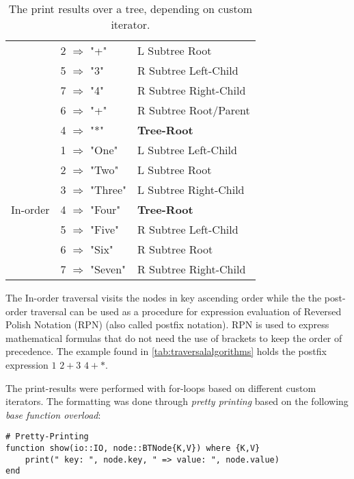\documentclass[a4paper, 11pt]{article}
\begin{document}
\begin{table}[h]
\begin{tabular}{|l|l|l|}
                                      & 2 $\Rightarrow$ "+"         & L Subtree Root\\
                                      & 5 $\Rightarrow$ "3"         & R Subtree Left-Child\\
                                      & 7 $\Rightarrow$ "4"         & R Subtree Right-Child\\
                                      & 6 $\Rightarrow$ "+"         & R Subtree Root/Parent\\\
                                      & 4 $\Rightarrow$ "*"         & \textbf{Tree-Root} \\
        \hline
        \multirow{7}{*}{In-order}     & 1 $\Rightarrow$ "One"       & L Subtree Left-Child\\
                                      & 2 $\Rightarrow$ "Two"       & L Subtree Root\\
                                      & 3 $\Rightarrow$ "Three"     & L Subtree Right-Child\\
                                      & 4 $\Rightarrow$ "Four"      & \textbf{Tree-Root} \\
                                      & 5 $\Rightarrow$ "Five"      & R Subtree Left-Child\\
                                      & 6 $\Rightarrow$ "Six"       & R Subtree Root\\
                                      & 7 $\Rightarrow$ "Seven"     & R Subtree Right-Child\\
        \hline
    \end{tabular}
    \caption{The print results over a tree, depending on custom iterator.}
    \label{tab:traversalalgorithms}
    \end{table}

    The In-order traversal visits the nodes in key ascending order while the
    the post-order traversal can be used as a procedure for 
    expression evaluation of Reversed Polish Notation (RPN)
    (also called postfix notation). RPN is used to express mathematical formulas 
    that do not need the use of 
    brackets to keep the order of precedence. 
    The example found in \autoref{tab:traversalalgorithms} holds the postfix
    expression $1$ $2 + 3$ $4 +*$.

    The print-results were performed with for-loops based on 
    different custom iterators. 
    The formatting was done through \emph{pretty printing} based on the 
    following \emph{base function overload}:
    \begin{verbatim}
# Pretty-Printing
function show(io::IO, node::BTNode{K,V}) where {K,V}
    print(" key: ", node.key, " => value: ", node.value)
end
    \end{verbatim}
\end{document}
